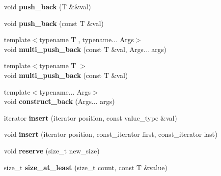 \begin{DoxyCompactItemize}
\mbox{\label{classnabla_1_1_s_t_l_vector_ex_a8fde5302f3fc7dd24a77b24c4acb9ecb}} 
void {\bfseries push\+\_\+back} (T \&\&val)
\item 
\mbox{\label{classnabla_1_1_s_t_l_vector_ex_aec687a6f3ef7bec21be3c86e389bc7d2}} 
void {\bfseries push\+\_\+back} (const T \&val)
\item 
\mbox{\label{classnabla_1_1_s_t_l_vector_ex_a5116db066e963666e7a6c57dd56a7267}} 
{\footnotesize template$<$typename T , typename... Args$>$ }\\void {\bfseries multi\+\_\+push\+\_\+back} (const T \&val, Args... args)
\item 
\mbox{\label{classnabla_1_1_s_t_l_vector_ex_a4c3b6e3a9226d0f6ec09f7ec1782d946}} 
{\footnotesize template$<$typename T $>$ }\\void {\bfseries multi\+\_\+push\+\_\+back} (const T \&val)
\item 
\mbox{\label{classnabla_1_1_s_t_l_vector_ex_ae5e9ce3a418acdf40c871090e443efb5}} 
{\footnotesize template$<$typename... Args$>$ }\\void {\bfseries construct\+\_\+back} (Args... args)
\item 
\mbox{\label{classnabla_1_1_s_t_l_vector_ex_abc8284cabd99f5a4ba0fc971e98630ab}} 
iterator {\bfseries insert} (iterator position, const value\+\_\+type \&val)
\item 
\mbox{\label{classnabla_1_1_s_t_l_vector_ex_a8cd6e298cb36c571bf67a0d5933097fa}} 
void {\bfseries insert} (iterator position, const\+\_\+iterator first, const\+\_\+iterator last)
\item 
\mbox{\label{classnabla_1_1_s_t_l_vector_ex_abc4120d95527b1e5758ee5f3f37efd8d}} 
void {\bfseries reserve} (size\+\_\+t new\+\_\+size)
\item 
\mbox{\label{classnabla_1_1_s_t_l_vector_ex_a10dd4b919ac2413d9e4c5c87a70adf6b}} 
size\+\_\+t {\bfseries size\+\_\+at\+\_\+least} (size\+\_\+t count, const T \&value)

\end{DoxyCompactItemize}
